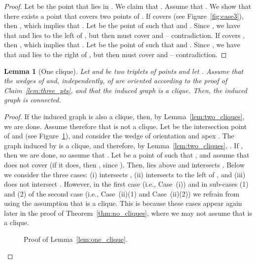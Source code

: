 \documentclass[11pt]{article}
\newtheorem{lemma}[theorem]{Lemma}
\begin{document}
{\begin{proof}
Let  be the point that lies in . We claim that .
Assume that . We show that there exists a point  that covers two points of .
If  covers  (see Figure~\ref{fig:case3}), then , which implies that . Let  be the point of  such that  and . Since , we have that  and  lies to the left of , but then  must cover  and  -- contradiction.
If  covers , then , which implies that . Let  be the point of  such that  and . Since , we have that  and  lies to the right of , but then  must cover  and  -- contradiction.

\end{proof}

\begin{lemma}[One clique]
Let  and  be two triplets of points and let .
Assume that the wedges of  and, independently, of  are oriented according to the proof of 
Claim~\ref{lem:three_pts}, and that the induced graph  is a clique.
Then, the induced graph  is connected.
\end{lemma}

\begin{proof}
If the induced graph  is also a clique, then, by Lemma~\ref{lem:two_cliques}, we are done.
Assume therefore that  is not a clique. 
Let  be the intersection point of  and  (see Figure~\ref{fig:oneclique}), and consider the wedge  of orientation  and apex .
The graph induced by  is a clique, and therefore, by Lemma~\ref{lem:two_cliques}, .
If , then we are done, so assume that .
Let  be a point of  such that , and assume that  does not cover  (if it does, then , since ). Then,  lies above  and  intersects .
Below we consider the three cases: (i)  intersects , (ii)  intersects  to the left of , and (iii)  does not intersect . However, in the first case (i.e., Case~(i)) and in sub-cases (1) and (2) of the second case (i.e., Case~(ii)(1) and Case~(ii)(2)) we refrain from using the assumption that  is a clique. This is because these cases appear again later in the proof of Theorem\mbox{~\ref{thm:no_cliques}}, where we may not assume that  is a clique.  


\begin{figure}[htb]
 \centering 
	\caption{Proof of Lemma~\ref{lem:one_clique}.}	\label{fig:oneclique}
\end{figure}




\end{proof}}
\end{document}
